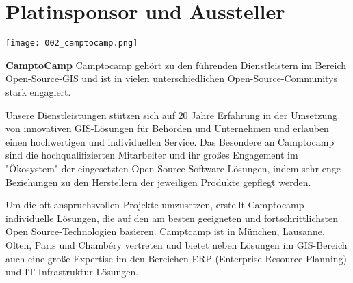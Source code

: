 \section*{Platinsponsor und Aussteller}
  \texttt{[image: 002\_camptocamp.png]}
  \vspace{1.0\baselineskip}
  
\noindent
{\bfseries CamptoCamp} Camptocamp gehört zu den führenden Dienstleistern im Bereich Open-Source-GIS und ist in vielen unterschiedlichen Open-Source-Communitys stark engagiert.

\noindent
Unsere Dienstleistungen stützen sich auf 20 Jahre Erfahrung in der Umsetzung von innovativen GIS-Lösungen für Behörden und Unternehmen und erlauben einen hochwertigen und individuellen Service. Das Besondere an Camptocamp sind die hochqualifizierten Mitarbeiter und ihr großes Engagement im "Ökosystem" der eingesetzten Open-Source Software-Lösungen, indem sehr enge Beziehungen zu den Herstellern der jeweiligen Produkte gepflegt werden.

\noindent
Um die oft anspruchsvollen Projekte umzusetzen, erstellt Camptocamp individuelle Lösungen, die auf den am besten geeigneten und fortschrittlichsten Open Source-Technologien basieren. Camptcamp ist in München, Lausanne, Olten, Paris und Chambéry vertreten und bietet neben Lösungen im GIS-Bereich auch eine große Expertise im den Bereichen ERP (Enterprise-Resource-Planning) und IT-Infrastruktur-Lösungen.
